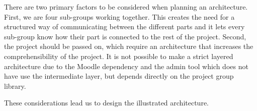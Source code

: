 There are two primary factors to be considered when planning an architecture. 
First, we are four sub-groups working together. 
This creates the need for a structured way of communicating between the different parts and it lets every sub-group know how their part is connected to the rest of the project. 
Second, the project should be passed on, which require an architecture that increases the comprehensibility of the project.
It is not possible to make a strict layered architecture due to the Moodle dependency and the admin tool which does not have use the intermediate layer, but depends directly on the project group library.

These considerations lead us to design the illustrated architecture.  













